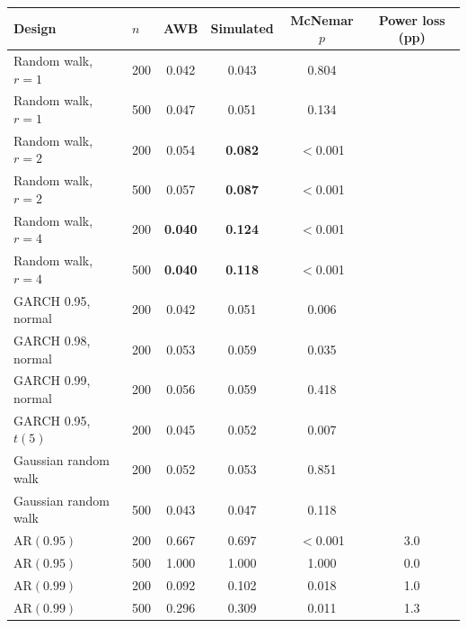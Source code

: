 \begin{tabular}{llcccc}
\toprule
Design & $n$ & AWB & Simulated & McNemar $p$ & Power loss (pp)\\
\midrule
Random walk, $r = 1$ & 200 & 0.042 & 0.043 & 0.804 &  \\
Random walk, $r = 1$ & 500 & 0.047 & 0.051 & 0.134 &  \\
Random walk, $r = 2$ & 200 & 0.054 & \textbf{0.082} & $<$0.001 &  \\
Random walk, $r = 2$ & 500 & 0.057 & \textbf{0.087} & $<$0.001 &  \\
Random walk, $r = 4$ & 200 & \textbf{0.040} & \textbf{0.124} & $<$0.001 &  \\
Random walk, $r = 4$ & 500 & \textbf{0.040} & \textbf{0.118} & $<$0.001 &  \\
GARCH 0.95, normal & 200 & 0.042 & 0.051 & 0.006 &  \\
GARCH 0.98, normal & 200 & 0.053 & 0.059 & 0.035 &  \\
GARCH 0.99, normal & 200 & 0.056 & 0.059 & 0.418 &  \\
GARCH 0.95, $t(5)$ & 200 & 0.045 & 0.052 & 0.007 &  \\
Gaussian random walk & 200 & 0.052 & 0.053 & 0.851 &  \\
Gaussian random walk & 500 & 0.043 & 0.047 & 0.118 &  \\
AR$(0.95)$ & 200 & 0.667 & 0.697 & $<$0.001 & 3.0 \\
AR$(0.95)$ & 500 & 1.000 & 1.000 & 1.000 & 0.0 \\
AR$(0.99)$ & 200 & 0.092 & 0.102 & 0.018 & 1.0 \\
AR$(0.99)$ & 500 & 0.296 & 0.309 & 0.011 & 1.3 \\
\bottomrule
\end{tabular}
